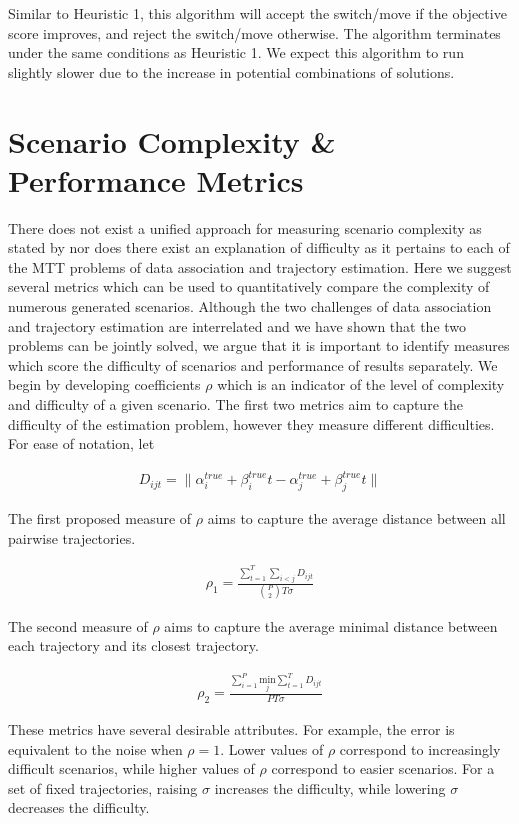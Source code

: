 \documentclass[journal]{IEEEtran}
\begin{document}
Similar to Heuristic 1, this algorithm will accept the switch/move if the objective score improves, and reject the switch/move otherwise. The algorithm terminates under the same conditions as Heuristic 1. We expect this algorithm to run slightly slower due to the increase in potential combinations of solutions. 

\section{Scenario Complexity \& Performance Metrics}
There does not exist a unified approach for measuring scenario complexity as stated by \cite{MTT-Taxonomy} nor does there exist an explanation of difficulty as it pertains to each of the MTT problems of data association and trajectory estimation. Here we suggest several metrics which can be used to quantitatively compare the complexity of numerous generated scenarios. Although the two challenges of data association and trajectory estimation are interrelated and we have shown that the two problems can be jointly solved, we argue that it is important to identify measures which score the difficulty of scenarios and performance of results separately. We begin by developing coefficients $\rho$ which is an indicator of the level of complexity and difficulty of a given scenario. The first two metrics aim to capture the difficulty of the estimation problem, however they measure different difficulties. For ease of notation, let 

\begin{align}
D_{ijt} = \| \alpha^{true}_{i} + \beta^{true}_{i}t - \alpha^{true}_{j} + \beta^{true}_{j}t \|
\end{align}

The first proposed measure of $\rho$ aims to capture the average distance between all pairwise trajectories. 

\begin{align}
\rho_{1} = \frac{\sum\limits_{t=1}^{T}\sum\limits_{i<j}D_{ijt}}{\binom{P}{2} T \sigma}
\end{align}

The second measure of $\rho$ aims to capture the average minimal distance between each trajectory and its closest trajectory. 

\begin{align}
\rho_{2} = \frac{\sum\limits_{i=1}^{P} \underset{j} {\text{min}} \sum\limits_{t=1}^{T}D_{ijt}}{P T \sigma}
\end{align}

These metrics have several desirable attributes. For example, the error is equivalent to the noise when $\rho = 1$.  Lower values of $\rho$ correspond to increasingly difficult scenarios, while higher values of $\rho$ correspond to easier scenarios. For a set of fixed trajectories, raising $\sigma$ increases the difficulty, while lowering $\sigma$ decreases the difficulty. 
\end{document}
